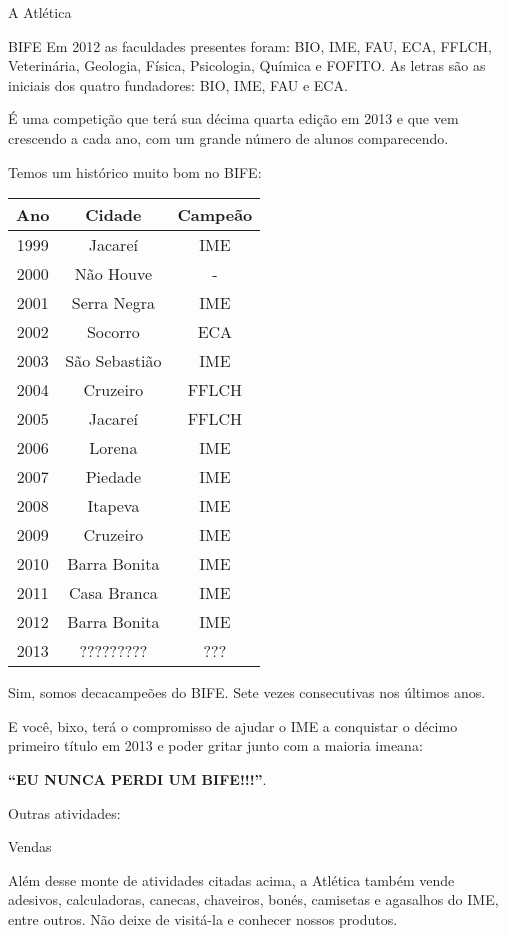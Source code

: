 \begin{secao}{A Atlética}
\begin{subsecao}{BIFE}
Em 2012 as faculdades presentes foram: BIO, IME, FAU, ECA, FFLCH, Veterinária,
Geologia, Física, Psicologia, Química e FOFITO. As letras são as iniciais
dos quatro fundadores: BIO, IME, FAU e ECA.

É uma competição que terá sua décima quarta edição em 2013 e que vem
crescendo a cada ano, com um grande número de alunos comparecendo.

Temos um histórico muito bom no BIFE:

\begin{center}
	\begin{tabular}{c|c|c}
	  Ano & Cidade & Campeão\\
	  \hline
	  1999 & Jacareí & IME\\
	  2000 & Não Houve & - \\
	  2001 & Serra Negra & IME\\
	  2002 & Socorro & ECA\\
	  2003 & São Sebastião & IME\\
	  2004 & Cruzeiro & FFLCH\\
	  2005 & Jacareí & FFLCH\\
	  2006 & Lorena & IME\\
	  2007 & Piedade & IME\\
	  2008 & Itapeva & IME\\
	  2009 & Cruzeiro & IME\\
	  2010 & Barra Bonita & IME\\
	  2011 & Casa Branca & IME\\
	  2012 & Barra Bonita & IME\\
	  2013 & ????????? & ???
	\end{tabular}
\end{center}

Sim, somos decacampeões do BIFE. Sete vezes consecutivas nos últimos anos.

E você, bixo, terá o compromisso de ajudar o IME a conquistar o décimo primeiro 
título em 2013 e poder gritar junto com a maioria imeana:

\textbf{``EU NUNCA PERDI UM BIFE!!!''}.

\end{subsecao}

Outras atividades:

\begin{subsecao}{Vendas}

Além desse monte de atividades citadas acima, a Atlética também vende
adesivos, calculadoras, canecas, chaveiros, bonés, camisetas e agasalhos do IME,
 entre outros. Não deixe de visitá-la e conhecer nossos produtos.


\end{subsecao}
\end{secao}
